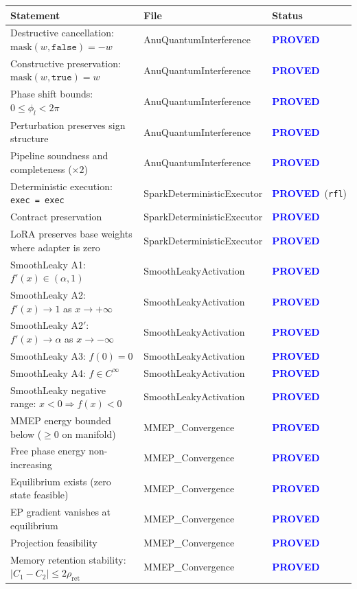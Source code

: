 \documentclass[11pt,letterpaper]{article}
\newcommand{\PROVED}{\textbf{\textcolor{blue}{PROVED}}}
\begin{document}
\begin{longtable}{p{8cm}p{3.5cm}l}
\toprule
Statement & File & Status \\
\midrule
\endhead
Destructive cancellation: $\mathrm{mask}(w,\mathtt{false})=-w$ & AnuQuantumInterference & \PROVED \\
Constructive preservation: $\mathrm{mask}(w,\mathtt{true})=w$ & AnuQuantumInterference & \PROVED \\
Phase shift bounds: $0 \leq \phi_l < 2\pi$ & AnuQuantumInterference & \PROVED \\
Perturbation preserves sign structure & AnuQuantumInterference & \PROVED \\
Pipeline soundness and completeness ($\times 2$) & AnuQuantumInterference & \PROVED \\
Deterministic execution: \texttt{exec = exec} & SparkDeterministicExecutor & \PROVED\ (\texttt{rfl}) \\
Contract preservation & SparkDeterministicExecutor & \PROVED \\
LoRA preserves base weights where adapter is zero & SparkDeterministicExecutor & \PROVED \\
SmoothLeaky A1: $f'(x) \in (\alpha,1)$ & SmoothLeakyActivation & \PROVED \\
SmoothLeaky A2: $f'(x) \to 1$ as $x \to +\infty$ & SmoothLeakyActivation & \PROVED \\
SmoothLeaky A2$'$: $f'(x) \to \alpha$ as $x \to -\infty$ & SmoothLeakyActivation & \PROVED \\
SmoothLeaky A3: $f(0) = 0$ & SmoothLeakyActivation & \PROVED \\
SmoothLeaky A4: $f \in C^\infty$ & SmoothLeakyActivation & \PROVED \\
SmoothLeaky negative range: $x < 0 \Rightarrow f(x) < 0$ & SmoothLeakyActivation & \PROVED \\
MMEP energy bounded below ($\geq 0$ on manifold) & MMEP\_Convergence & \PROVED \\
Free phase energy non-increasing & MMEP\_Convergence & \PROVED \\
Equilibrium exists (zero state feasible) & MMEP\_Convergence & \PROVED \\
EP gradient vanishes at equilibrium & MMEP\_Convergence & \PROVED \\
Projection feasibility & MMEP\_Convergence & \PROVED \\
Memory retention stability: $|C_1 - C_2| \leq 2\rho_{\text{ret}}$ & MMEP\_Convergence & \PROVED \\

\end{longtable}
\end{document}
